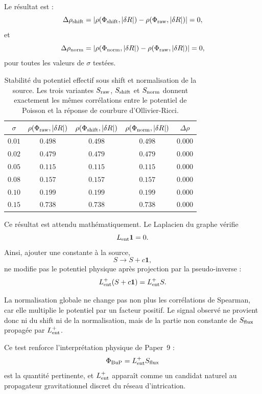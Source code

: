 \documentclass[11pt,a4paper]{article}
\begin{document}
Le résultat est :
\[
\Delta\rho_{\rm shift}
=
\left|
\rho(\Phi_{\rm shift},|\delta R|)
-
\rho(\Phi_{\rm raw},|\delta R|)
\right|
=
0,
\]
et
\[
\Delta\rho_{\rm norm}
=
\left|
\rho(\Phi_{\rm norm},|\delta R|)
-
\rho(\Phi_{\rm raw},|\delta R|)
\right|
=
0,
\]
pour toutes les valeurs de \(\sigma\) testées.

\begin{table}[htbp]
\centering
\begin{tabular}{c c c c c}
\toprule
\(\sigma\) & \(\rho(\Phi_{\rm raw},|\delta R|)\) & \(\rho(\Phi_{\rm shift},|\delta R|)\) & \(\rho(\Phi_{\rm norm},|\delta R|)\) & \(\Delta\rho\) \\
\midrule
\(0.01\) & \(0.498\) & \(0.498\) & \(0.498\) & \(0.000\) \\
\(0.02\) & \(0.479\) & \(0.479\) & \(0.479\) & \(0.000\) \\
\(0.05\) & \(0.115\) & \(0.115\) & \(0.115\) & \(0.000\) \\
\(0.08\) & \(0.157\) & \(0.157\) & \(0.157\) & \(0.000\) \\
\(0.10\) & \(0.199\) & \(0.199\) & \(0.199\) & \(0.000\) \\
\(0.15\) & \(0.738\) & \(0.738\) & \(0.738\) & \(0.000\) \\
\bottomrule
\end{tabular}
\caption{
Stabilité du potentiel effectif sous shift et normalisation de la source.
Les trois variantes \(S_{\rm raw}\), \(S_{\rm shift}\) et \(S_{\rm norm}\)
donnent exactement les mêmes corrélations entre le potentiel de Poisson et la
réponse de courbure d'Ollivier-Ricci.
}
\end{table}

Ce résultat est attendu mathématiquement. Le Laplacien du graphe vérifie
\[
L_{\rm ent}\mathbf{1}=0.
\]
Ainsi, ajouter une constante à la source,
\[
S\longrightarrow S+c\mathbf{1},
\]
ne modifie pas le potentiel physique après projection par la pseudo-inverse :
\[
L_{\rm ent}^{+}(S+c\mathbf{1})
=
L_{\rm ent}^{+}S.
\]

La normalisation globale ne change pas non plus les corrélations de Spearman,
car elle multiplie le potentiel par un facteur positif. Le signal observé ne
provient donc ni du shift ni de la normalisation, mais de la partie non
constante de \(S_{\rm flux}\) propagée par \(L_{\rm ent}^{+}\).

Ce test renforce l'interprétation physique de Paper~9 :
\[
\Phi_{\rm BuP}
=
L_{\rm ent}^{+}S_{\rm flux}
\]
est la quantité pertinente, et \(L_{\rm ent}^{+}\) apparaît comme un candidat
naturel au propagateur gravitationnel discret du réseau d'intrication.
\end{document}
